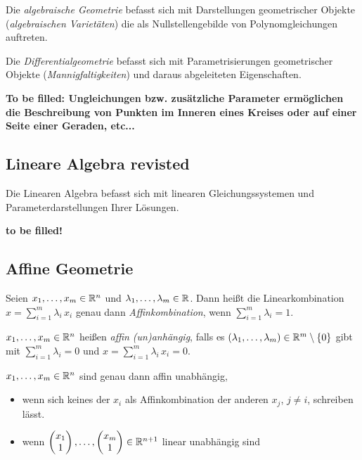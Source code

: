 

Die {\em algebraische Geometrie} befasst sich mit Darstellungen
geometrischer Objekte ({\em algebraischen Varietäten}) die als
Nullstellengebilde von Polynomgleichungen auftreten.


Die {\em Differentialgeometrie} befasst sich mit Parametrisierungen
geometrischer Objekte ({\em Mannigfaltigkeiten}) und daraus
abgeleiteten Eigenschaften.%


\medskip

{\bf To be filled: Ungleichungen bzw. zusätzliche Parameter 
ermöglichen die Beschreibung von Punkten im Inneren eines Kreises oder
auf einer Seite einer Geraden, etc...}





\subsection*{Lineare Algebra revisted}

Die Linearen Algebra befasst sich mit linearen Gleichungssystemen und
Parameterdarstellungen Ihrer Lösungen.

{\bf to be filled!}




\subsection*{Affine Geometrie}


\begin{defi}
Seien $x_1,\dots,x_m\in\mathbb R^n$ und
$\lambda_1,\dots,\lambda_m\in\mathbb R$. Dann heißt die Linearkombination
$x=\sum_{i=1}^m\lambda_i\,x_i $ genau dann 
{\em Affinkombination}, wenn $\sum_{i=1}^m\lambda_i = 1$.
\end{defi}



\begin{defi}
$x_1,\dots,x_m\in\mathbb R^n$ heißen
{\em affin (un)anhängig}, falls es
$(\lambda_1,\dots,\lambda_m)\in\mathbb R^m\setminus\{0\}$ gibt mit
$\sum_{i=1}^m\lambda_i = 0$ und $x=\sum_{i=1}^m\lambda_i\,x_i = 0$.
\end{defi}


\begin{thm}
$x_1,\dots,x_m\in\mathbb R^n$ sind genau dann affin unabhängig,
\begin{itemize}
\item
wenn sich keines der $x_i$ als Affinkombination der anderen $x_j$,
$j\not= i$, schreiben lässt.

\item
wenn $\begin{pmatrix}x_1\\1\end{pmatrix},\dots,\begin{pmatrix}x_m\\1\end{pmatrix}\in\mathbb R^{n+1}$ linear unabhängig sind
\end{itemize}
\end{thm}


